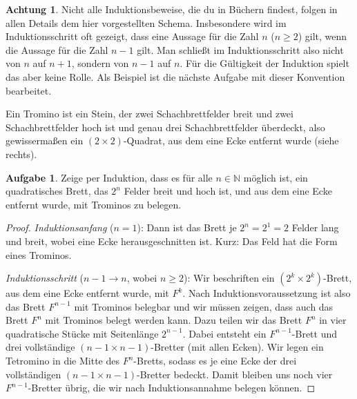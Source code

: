 \documentclass[a4paper,ngerman,12pt]{scrartcl}
\newcommand{\N}{\mathbb{N}}
\theoremstyle{definition}
\newtheorem*{aufg}{Aufgabe}
\newtheorem*{acht}{Achtung}
\begin{document}
\begin{shaded}
  \begin{acht}
    Nicht alle Induktionsbeweise, die du in Büchern findest, folgen in allen Details dem hier vorgestellten Schema. Insbesondere wird im Induktionsschritt oft gezeigt, dass eine Aussage für die Zahl $n$ ($n \geq 2$) gilt, wenn die Aussage für die Zahl $n{-}1$ gilt. Man schließt im Induktionsschritt also nicht von $n$ auf $n{+}1$, sondern von $n{-}1$ auf $n$. Für die Gültigkeit der Induktion spielt das aber keine Rolle. Als Beispiel ist die nächste Aufgabe mit dieser Konvention bearbeitet.
  \end{acht}
\end{shaded}

\begin{figure}
  \vspace{-30pt}
  \begin{center}
  \end{center}
  \vspace{-35pt}
\end{figure}

Ein Tromino ist ein Stein, der zwei Schachbrettfelder breit und zwei Schachbrettfelder hoch ist und genau drei Schachbrettfelder überdeckt, also gewissermaßen ein $(2 \times 2)$-Quadrat, aus dem eine Ecke entfernt wurde (siehe rechts). 

\begin{aufg}
  Zeige per Induktion, dass es für alle $n \in \N$ möglich ist, ein quadratisches Brett, das $2^n$ Felder breit und hoch ist, und aus dem eine Ecke entfernt wurde, mit Trominos zu belegen.
\end{aufg}

\begin{proof}
  \emph{Induktionsanfang} ($n=1$): Dann ist das Brett je $2^n = 2^1 = 2$ Felder lang und breit, wobei eine Ecke herausgeschnitten ist. Kurz: Das Feld hat die Form eines Trominos.

  \emph{Induktionsschritt} ($n{-}1 \to n$, wobei $n \geq 2$): Wir beschriften ein $(2^k \times 2^k)$-Brett, aus dem eine Ecke entfernt wurde, mit $F^k$. Nach Induktionsvoraussetzung ist also das Brett $F^{n-1}$ mit Trominos belegbar und wir müssen zeigen, dass auch das Brett $F^n$ mit Trominos belegt werden kann. Dazu teilen wir das Brett $F^n$ in vier quadratische Stücke mit Seitenlänge $2^{n-1}$. Dabei entsteht ein $F^{n-1}$-Brett und drei vollständige $(n{-}1 \times n{-}1)$-Bretter (mit allen Ecken). Wir legen ein Tetromino in die Mitte des $F^n$-Bretts, sodass es je eine Ecke der drei vollständigen $(n{-}1 \times n{-}1)$-Bretter bedeckt. Damit bleiben uns noch vier $F^{n-1}$-Bretter übrig, die wir nach Induktionsannahme belegen können.
\end{proof}
\end{document}
